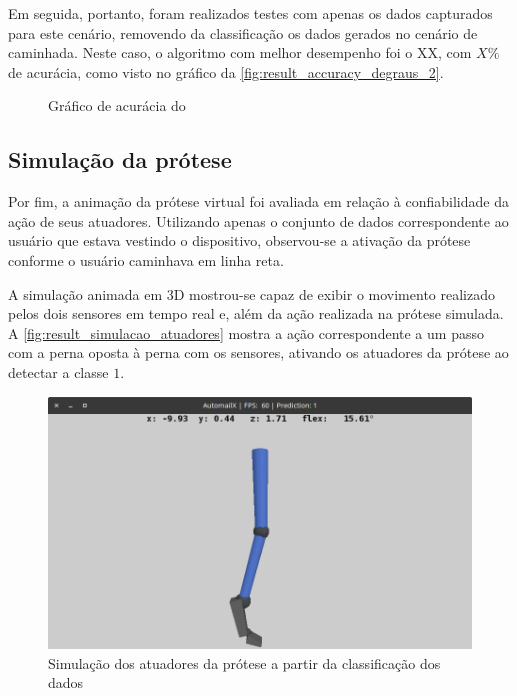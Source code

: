 Em seguida, portanto, foram realizados testes com apenas os dados capturados para este cenário, removendo da classificação os dados gerados no cenário de caminhada. Neste caso, o algoritmo com melhor desempenho foi o XX, com \(X\%\) de acurácia, como visto no gráfico da \autoref{fig:result_accuracy_degraus_2}.

\begin{figure}[ht]
	\caption{\label{fig:result_accuracy_degraus_2}Gráfico de acurácia do}
	\begin{center}
	\end{center}
\end{figure}


\subsection{Simulação da prótese}

Por fim, a animação da prótese virtual foi avaliada em relação à confiabilidade da ação de seus atuadores. Utilizando apenas o conjunto de dados correspondente ao usuário que estava vestindo o dispositivo, observou-se a ativação da prótese conforme o usuário caminhava em linha reta.

A simulação animada em 3D mostrou-se capaz de exibir o movimento realizado pelos dois sensores em tempo real e, além da ação realizada na prótese simulada. A \autoref{fig:result_simulacao_atuadores} mostra a ação correspondente a um passo com a perna oposta à perna com os sensores, ativando os atuadores da prótese ao detectar a classe \(1\).

\begin{figure}[ht]
	\caption{\label{fig:result_simulacao_atuadores}Simulação dos atuadores da prótese a partir da classificação dos dados}
	\begin{center}
	    \includegraphics[width=.8\textwidth]{resources/result_simulacao_atuadores}
	\end{center}
\end{figure}